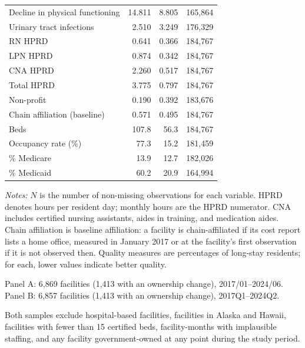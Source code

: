 \documentclass[11pt]{article}
\begin{document}
\begin{table}[!ht]
\begin{threeparttable}
\begin{tabularx}{\textwidth}{@{} X r r r @{} }
Decline in physical functioning & 14.811 & 8.805 & 165,864 \\
Urinary tract infections & 2.510 & 3.249 & 176,329 \\
\addlinespace[0.4em]
RN HPRD & 0.641 & 0.366 & 184,767 \\
LPN HPRD & 0.874 & 0.342 & 184,767 \\
CNA HPRD & 2.260 & 0.517 & 184,767 \\
Total HPRD & 3.775 & 0.797 & 184,767 \\
\addlinespace[0.4em]
Non-profit & 0.190 & 0.392 & 183,676 \\
Chain affiliation (baseline) & 0.571 & 0.495 & 184,767 \\
Beds & 107.8 & 56.3 & 184,767 \\
Occupancy rate (\%) & 77.3 & 15.2 & 181,459 \\
\% Medicare & 13.9 & 12.7 & 182,026 \\
\% Medicaid & 60.2 & 20.9 & 164,994 \\
\bottomrule
\end{tabularx}

\begin{tablenotes}[flushleft]
\footnotesize
\item \textit{Notes:} $N$ is the number of non-missing observations for each variable. HPRD denotes hours per resident day; monthly hours are the HPRD numerator. CNA includes certified nursing assistants, aides in training, and medication aides. Chain affiliation is baseline affiliation: a facility is chain-affiliated if its cost report lists a home office, measured in January 2017 or at the facility's first observation if it is not observed then. Quality measures are percentages of long-stay residents; for each, lower values indicate better quality.
\item Panel A: 6,869 facilities (1,413 with an ownership change), 2017/01--2024/06. Panel B: 6,857 facilities (1,413 with an ownership change), 2017Q1--2024Q2.
\item Both samples exclude hospital-based facilities, facilities in Alaska and Hawaii, facilities with fewer than 15 certified beds, facility-months with implausible staffing, and any facility government-owned at any point during the study period.
\end{tablenotes}

\end{threeparttable}
\end{table}
\end{document}
